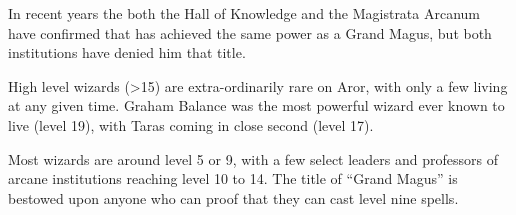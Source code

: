 In recent years the both the Hall of Knowledge and the Magistrata Arcanum
have confirmed that  has achieved the same power as a
Grand Magus, but both institutions have denied him that title.

\begin{note}
  High level wizards (>15) are extra-ordinarily rare on Aror, with only a few
  living at any given time. Graham Balance was the most powerful wizard ever
  known to live (level 19), with Taras coming in close second (level 17).

  Most wizards are around level 5 or 9, with a few select leaders and professors
  of arcane institutions reaching level 10 to 14. The title of ``Grand Magus''
  is bestowed upon anyone who can proof that they can cast level nine spells.
\end{note}
